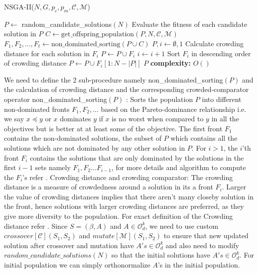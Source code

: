 \begin{algorithm}[H] \label{nsga2_psoudocode}
\caption{NSGA-II($N,G,p_c,p_m,\mathcal{C},\mathcal{M}$)}
\begin{algorithmic}[1]
\State $P \gets$ random\_candidate\_solutions$(N)$ 
\State Evaluate the fitness of each candidate solution in $P$
\State $C \gets \text{get\_offspring\_population}(P,N, \mathcal{C}, \mathcal{M})$
\State $F_1, F_2,..., F_t \gets \text{non\_dominated\_sorting}(P \cup C)$ 
\State $P , i \gets \emptyset, 1 $
\State Calculate crowding distance for each solution in $F_i$
\State $P \gets P \cup F_i$
\State $i \gets i+1$
\EndWhile
{}
\State Sort $F_i$ in descending order of crowding distance
\State $P \gets P \cup F_i[1:N-|P|]$ 
\EndIf 
\EndFor 
\State \Return $P$
\State \textbf{complexity: } $O()$
\end{algorithmic}
\end{algorithm}
We need to define the 2 sub-procedure namely non\_dominated\_sorting$(P)$ and the calculation of crowding distance and the corresponding crowded-comparator operator 
\newline non\_dominated\_sorting$(P)$ : Sorts the population $P$ into different non-dominated fronts $F_1,F_2,...$ based on the Pareto-dominance relationship i.e. we say $x \preceq y$ or $x$ dominates $y$ if $x$ is no worst when compared to $y$ in all the objectives but is better at at least some of the objective. The first front $F_1$ contains the non-dominated solutions, the subset of $P$ which contains all the solutions which are not dominated by any other solution in $P$. For $i>1$, the $i$'th front $F_i$ contains the solutions that are only dominated by the solutions in the first $i-1$ sets namely $F_1,F_2...F_{i-1}$, for more details and algorithm to compute the $F_i$'s refer \cite{deb2002fast}.
\newline \newline  Crowding distance and crowding comparator: The crowding distance is a measure of crowdedness around a solution in its a front $F_i$. Larger the value of crowding distances implies that there aren't many closeby solution in the front, hence solutions with larger crowding distances are preferred, as they give more diversity to the population. For exact definition of the Crowding distance refer \cite{deb2002fast}.
\newline Since $S = (\beta,A)$ and $A \in \mathcal{O}^{k}_{d}$, we need to use custom $crossover[\mathcal{C}](S_1,S_2)$ and $mutate[\mathcal{M}](S_1,S_2)$ to ensure that new updated solution after crossover and mutation have $A's \in \mathcal{O}^{k}_{d}$ and also need to modify $random\_candidate\_solutions(N)$ so that the initial solutions have $A's \in \mathcal{O}^{k}_{d}$. For initial population we can simply orthonormalize $A$'s in the initial population.
